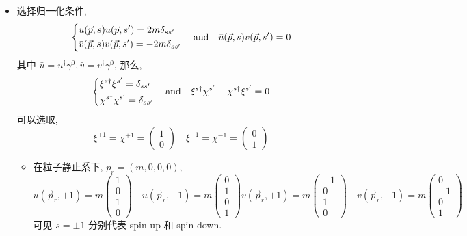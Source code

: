 \begin{itemize}
	\item 选择归一化条件,
	\begin{equation}
		\begin{dcases}
			\bar{u}(\vec{p}, s) u(\vec{p}, s') = 2 m \delta_{s s'} \\
			\bar{v}(\vec{p}, s) v(\vec{p}, s') = - 2 m \delta_{s s'}
		\end{dcases} \quad \text{and} \quad \bar{u}(\vec{p}, s) v(\vec{p}, s') = 0
	\end{equation}
	其中 $\bar{u} = u^\dag \gamma^0, \bar{v} = v^\dag \gamma^0$, 那么,
	\begin{equation}
		\begin{dcases}
			\xi^{s \dag} \xi^{s'} = \delta_{s s'} \\
			\chi^{s \dag} \chi^{s'} = \delta_{s s'}
		\end{dcases} \quad \text{and} \quad \xi^{s \dag} \chi^{s'} - \chi^{s \dag} \xi^{s'} = 0
	\end{equation}
	可以选取,
	\begin{equation}
		\xi^{+ 1} = \chi^{+ 1} = \begin{pmatrix}
			1 \\
			0
		\end{pmatrix} \quad \xi^{- 1} = \chi^{- 1} = \begin{pmatrix}
			0 \\
			1
		\end{pmatrix}
	\end{equation}
	\begin{itemize}
		\item 在粒子静止系下, $p_r = (m, 0, 0, 0)$,
		\begin{equation}
			u(\vec{p}_r, + 1) = m \begin{pmatrix}
				1 \\
				0 \\
				1 \\
				0
			\end{pmatrix} \quad u(\vec{p}_r, - 1) = m \begin{pmatrix}
				0 \\
				1 \\
				0 \\
				1
			\end{pmatrix} v(\vec{p}_r, + 1) = m \begin{pmatrix}
				- 1 \\
				0 \\
				1 \\
				0
			\end{pmatrix} \quad v(\vec{p}_r, - 1) = m \begin{pmatrix}
				0 \\
				- 1 \\
				0 \\
				1
			\end{pmatrix}
		\end{equation}
		可见 $s = \pm 1$ 分别代表 spin-up 和 spin-down.
	\end{itemize}
	

\end{itemize}
